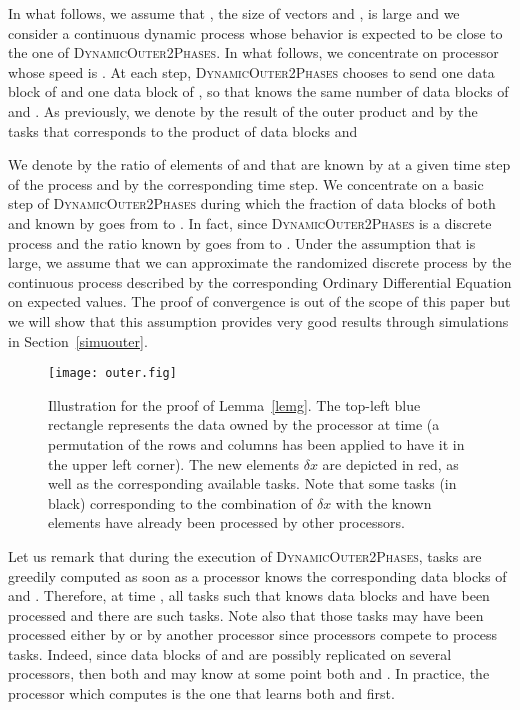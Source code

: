 \documentclass[a4paper,10pt]{article}
\newcommand{\stupidthreshold}{\textsc{Dynamic\-Outer\-2Phases}\xspace}
\newcommand{\ema}[1]{\ensuremath{#1}\xspace}
\newcommand{\dx}{\ema{\delta x}}
\begin{document}
In what follows, we assume that , the size of vectors  and
, is large and we consider a continuous dynamic process whose
behavior is expected to be close to the one of \stupidthreshold. In what
follows, we concentrate on processor  whose speed is .
At each step, \stupidthreshold chooses to send one data block of  and one
data block of , so that  knows the same number of data blocks
of  and . As previously, we denote by  the result of
the outer product and by  the tasks that corresponds to the
product of data blocks  and 



We denote by  the ratio of elements of  and  that are
known by  at a given time step of the process and by
 the corresponding time step. We concentrate on a basic step
of \stupidthreshold during which the fraction of data blocks of both  and
 known by  goes from  to . In fact, since \stupidthreshold
is a discrete process and the ratio known by  goes from 
to . Under the assumption that  is large, we
assume that we can approximate the randomized discrete process by the
continuous process described by the corresponding Ordinary
Differential Equation on expected values. The proof of convergence is
out of the scope of this paper but we will show that this assumption
provides very good results through simulations in Section~\ref{simuouter}.



\begin{figure}[htbp]
  \centering
  \texttt{[image: outer.fig]}
  \caption{Illustration for the proof of Lemma~\ref{lemg}. The
    top-left blue  rectangle represents the data owned by
  the processor at time  (a permutation of the rows and
  columns has been applied to have it in the upper left corner). The new elements \dx are depicted in red, as well as the
  corresponding available tasks. Note that some tasks (in black)
  corresponding to the combination of \dx with the known elements have
already been processed by other processors.}
  \label{fig.evolv}
\end{figure}



Let us remark that during the execution of \stupidthreshold, tasks 
are greedily computed as soon as a processor knows the corresponding
data blocks of  and .  Therefore, at time , all
tasks  such that  knows data blocks  and  have
been processed and there are  such tasks. Note also
that those tasks may have been processed either by  or by another
processor  since processors compete to process tasks. Indeed,
since data blocks of  and  are possibly replicated on
several processors, then both  and  may know at some point
both  and . In practice, the processor which computes
 is the one that learns both  and  first.
\end{document}
